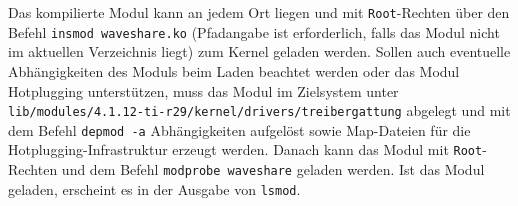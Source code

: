 
Das kompilierte Modul kann an jedem Ort liegen und mit \texttt{Root}-Rechten über den Befehl \texttt{insmod waveshare.ko} (Pfadangabe ist erforderlich, falls das Modul nicht im aktuellen Verzeichnis liegt) zum Kernel geladen werden. Sollen auch eventuelle Abhängigkeiten des Moduls beim Laden beachtet werden oder das Modul Hotplugging unterstützen, muss das Modul im Zielsystem unter \\ 
\texttt{lib/modules/4.1.12-ti-r29/kernel/drivers/treibergattung} abgelegt und mit dem Befehl \texttt{depmod -a} Abhängigkeiten aufgelöst sowie Map-Dateien für die Hotplugging-Infrastruktur erzeugt werden. %
Danach kann das Modul mit \texttt{Root}-Rechten und dem Befehl \texttt{modprobe waveshare} geladen werden. Ist das Modul geladen, erscheint es in der Ausgabe von \texttt{lsmod}. %






